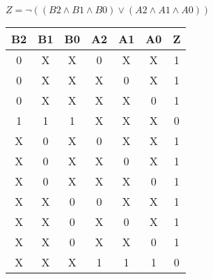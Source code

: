
\begin{center}
    {\(Z = \lnot ((B2 \land B1 \land B0) \lor (A2 \land A1 \land A0)) \)}
    \begin{table}[h] %
        \begin{center}
            \begin{tabular}{|c|c|c|c|c|c||c|} \hline
            B2 & B1 & B0 & A2 & A1 & A0 & Z \\ \hline\hline
            0  & X  & X  & 0  & X  & X  & 1\\ \hline
            0  & X  & X  & X  & 0  & X  & 1\\ \hline
            0  & X  & X  & X  & X  & 0  & 1\\ \hline
            1  & 1  & 1  & X  & X  & X  & 0\\ \hline
            X  & 0  & X  & 0  & X  & X  & 1\\ \hline
            X  & 0  & X  & X  & 0  & X  & 1\\ \hline
            X  & 0  & X  & X  & X  & 0  & 1\\ \hline
            X  & X  & 0  & 0  & X  & X  & 1\\ \hline
            X  & X  & 0  & X  & 0  & X  & 1\\ \hline
            X  & X  & 0  & X  & X  & 0  & 1\\ \hline
            X  & X  & X  & 1  & 1  & 1  & 0\\ \hline
            \end{tabular}
        \end{center}
    \end{table}
\end{center}
